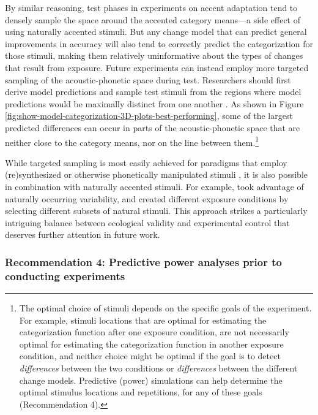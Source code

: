 \documentclass[
  11pt,
  man,floatsintext]{apa6}
\begin{document}
By similar reasoning, test phases in experiments on accent adaptation tend to densely sample the space around the accented category means---a side effect of using naturally accented stimuli. But any change model that can predict general improvements in accuracy will also tend to correctly predict the categorization for those stimuli, making them relatively uninformative about the types of changes that result from exposure. Future experiments can instead employ more targeted sampling of the acoustic-phonetic space during test. Researchers should first derive model predictions and sample test stimuli from the regions where model predictions would be maximally distinct from one another \autocite[for initial efforts along these lines, see][]{burchill-jaeger2022}. As shown in Figure \ref{fig:show-model-categorization-3D-plots-best-performing}, some of the largest predicted differences can occur in parts of the acoustic-phonetic space that are neither close to the category means, nor on the line between them.\footnote{The optimal choice of stimuli depends on the specific goals of the experiment. For example, stimuli locations that are optimal for estimating the categorization function after one exposure condition, are not necessarily optimal for estimating the categorization function in another exposure condition, and neither choice might be optimal if the goal is to detect \emph{differences} between the two conditions or \emph{differences} between the different change models. Predictive (power) simulations can help determine the optimal stimulus locations and repetitions, for any of these goals (Recommendation 4).}

While targeted sampling is most easily achieved for paradigms that employ (re)synthesized or otherwise phonetically manipulated stimuli \autocites[for examples, see][]{bejjanki2011,burchill-jaeger2022,idemaru-holt2020}, it is also possible in combination with naturally accented stimuli. For example, \textcite{chodroff-wilson2020} took advantage of naturally occurring variability, and created different exposure conditions by selecting different subsets of natural stimuli. This approach strikes a particularly intriguing balance between ecological validity and experimental control that deserves further attention in future work.

\hypertarget{recommendation-4-predictive-power-analyses-prior-to-conducting-experiments}{%
\subsubsection{Recommendation 4: Predictive power analyses prior to conducting experiments}\label{recommendation-4-predictive-power-analyses-prior-to-conducting-experiments}}
\end{document}
